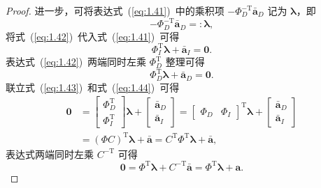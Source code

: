 \begin{proof}
进一步，可将表达式~(\ref{eq:1.41})~中的乘积项 $-\Phi_D^{-\mathrm{T}} \bar{\boldsymbol{a}}_D$ 记为 $\boldsymbol{\lambda}$，即
\begin{equation}\label{eq:1.42}
-\Phi_D^{-\mathrm{T}} \bar{\boldsymbol{a}}_D =: \boldsymbol{\lambda},
\end{equation}
将式~(\ref{eq:1.42})~代入式~(\ref{eq:1.41})~可得
\begin{equation}\label{eq:1.43}
\Phi_I^{\mathrm{T}} \boldsymbol{\lambda} + \bar{\boldsymbol{a}}_I = \boldsymbol{0}.
\end{equation}
表达式~(\ref{eq:1.42})~两端同时左乘 $\Phi_D^{\mathrm{T}}$ 整理可得
\begin{equation}\label{eq:1.44}
\Phi_D^{\mathrm{T}} \boldsymbol{\lambda} + \bar{\boldsymbol{a}}_D = \boldsymbol{0}.
\end{equation}
联立式~(\ref{eq:1.43})~和式~(\ref{eq:1.44})~可得
\begin{equation}\label{eq:1.45}
\begin{aligned}
\boldsymbol{0} &= \begin{bmatrix} \Phi_D^{\mathrm{T}} \\ \Phi_I^{\mathrm{T}} \end{bmatrix} \!\boldsymbol{\lambda} + \begin{bmatrix} \bar{\boldsymbol{a}}_D \\ \bar{\boldsymbol{a}}_I \end{bmatrix} = \begin{bmatrix} \Phi_D & \Phi_I \end{bmatrix}^{\!\mathrm{T}} \!\boldsymbol{\lambda} + \begin{bmatrix} \bar{\boldsymbol{a}}_D \\ \bar{\boldsymbol{a}}_I \end{bmatrix} \\
&= (\Phi C)^{\mathrm{T}} \boldsymbol{\lambda} + \bar{\boldsymbol{a}} = C^{\mathrm{T}} \Phi^{\mathrm{T}} \boldsymbol{\lambda} + \bar{\boldsymbol{a}},
\end{aligned}
\end{equation}
表达式两端同时左乘 $C^{-\mathrm{T}}$ 可得
\begin{equation}\label{eq:1.46}
\boldsymbol{0} = \Phi^{\mathrm{T}} \boldsymbol{\lambda} + C^{-\mathrm{T}} \bar{\boldsymbol{a}} = \Phi^{\mathrm{T}} \boldsymbol{\lambda} + \boldsymbol{a}.
\end{equation}
\end{proof}

